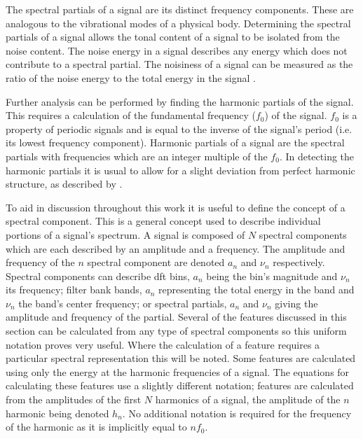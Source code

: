 		The spectral partials of a signal are its distinct frequency components. These are analogous to the
		vibrational modes of a physical body. Determining the spectral partials of a signal allows the tonal
		content of a signal to be isolated from the noise content. The noise energy in a signal describes any
		energy which does not contribute to a spectral partial. The noisiness of a signal can be measured as the
		ratio of the noise energy to the total energy in the signal \citep{serra1998sound}.

		Further analysis can be performed by finding the harmonic partials of the signal. This requires a
		calculation of the fundamental frequency ($f_{0}$) of the signal. $f_{0}$ is a property of periodic signals
		and is equal to the inverse of the signal's period (i.e. its lowest frequency component). Harmonic partials
		of a signal are the spectral partials with frequencies which are an integer multiple of the $f_{0}$. In
		detecting the harmonic partials it is usual to allow for a slight deviation from perfect harmonic
		structure, as described by \citet{peeters2011the}.

		To aid in discussion throughout this work it is useful to define the concept of a spectral component. This
		is a general concept used to describe individual portions of a signal's spectrum. A signal is composed of
		$N$ spectral components which are each described by an amplitude and a frequency. The amplitude and
		frequency of the $n$ spectral component are denoted $a_{n}$ and $\nu_{n}$ respectively. Spectral
		components can describe \acrshort{dft} bins, $a_{n}$ being the bin's magnitude and $\nu_{n}$ its frequency;
		filter bank bands, $a_{n}$ representing the total energy in the band and $\nu_{n}$ the band's center
		frequency; or spectral partials, $a_{n}$ and $\nu_{n}$ giving the amplitude and frequency of the partial.
		Several of the features discussed in this section can be calculated from any type of spectral components so
		this uniform notation proves very useful. Where the calculation of a feature requires a particular spectral
		representation this will be noted. Some features are calculated using only the energy at the harmonic
		frequencies of a signal. The equations for calculating these features use a slightly different notation;
		features are calculated from the amplitudes of the first $N$ harmonics of a signal, the amplitude of the
		$n$ harmonic being denoted $h_{n}$. No additional notation is required for the frequency of the
		harmonic as it is implicitly equal to $nf_{0}$.

